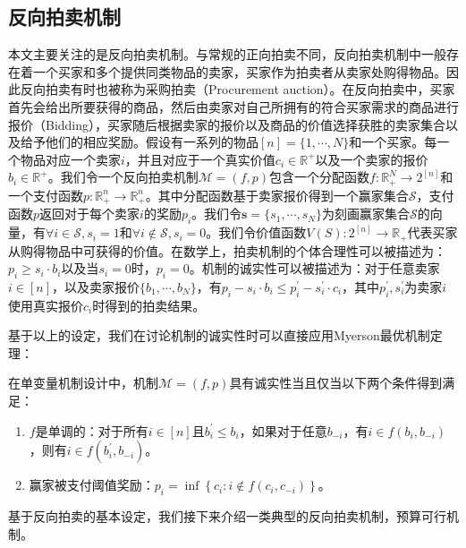 


\subsection{反向拍卖机制}

本文主要关注的是反向拍卖机制。与常规的正向拍卖不同，反向拍卖机制中一般存在着一个买家和多个提供同类物品的卖家，买家作为拍卖者从卖家处购得物品。因此反向拍卖有时也被称为采购拍卖（Procurement auction）。在反向拍卖中，买家首先会给出所要获得的商品，然后由卖家对自己所拥有的符合买家需求的商品进行报价（Bidding），买家随后根据卖家的报价以及商品的价值选择获胜的卖家集合以及给予他们的相应奖励。假设有一系列的物品$[n]=\{1,\cdots,N\}$和一个买家。每一个物品对应一个卖家$i$，并且对应于一个真实价值$c_i\in\mathbb{R}^+$以及一个卖家的报价$b_i\in\mathbb{R}^+$。我们令一个反向拍卖机制$\mathcal{M}=(f, p)$包含一个分配函数$f: \mathbb{R}_{+}^{N} \rightarrow 2^{[n]}$和一个支付函数$p: \mathbb{R}_{+}^{n} \rightarrow \mathbb{R}_{+}^{n}$。其中分配函数基于卖家报价得到一个赢家集合$\mathcal{S}$，支付函数$p$返回对于每个卖家$i$的奖励$p_i$。我们令$\mathbf{s}=\{s_1,\cdots,s_N\}$为刻画赢家集合$\mathcal{S}$的向量，有$\forall i\in\mathcal{S}, s_i=1$和$\forall i\notin\mathcal{S}, s_i=0$。我们令价值函数$V(S): 2^{[n]} \rightarrow \mathbb{R}_{+}$代表买家从购得物品中可获得的价值。在数学上，拍卖机制的个体合理性可以被描述为：$p_i\geq s_i\cdot b_i$以及当$s_i=0$时，$p_i=0$。机制的诚实性可以被描述为：对于任意卖家$i\in[n]$，以及卖家报价$\{b_1,\cdots,b_N\}$，有$p_{i}-s_{i} \cdot b_{i} \leq p_{i}^{\prime}-s_{i}^{\prime} \cdot c_{i}$，其中$p_{i}^{\prime},s_{i}^{\prime}$为卖家$i$使用真实报价$c_i$时得到的拍卖结果。

基于以上的设定，我们在讨论机制的诚实性时可以直接应用Myerson最优机制定理\cite{Myerson1981}：
\begin{thm}
在单变量机制设计中，机制$\mathcal{M}=(f, p)$具有诚实性当且仅当以下两个条件得到满足：
\begin{enumerate}
\item $f$是单调的：对于所有$i \in[n]$且$b_{i}^{\prime} \leq b_{i}$，如果对于任意$b_{-i}$，有$i\in f\left(b_{i}, b_{-i}\right)$，则有$i \in f\left(b_{i}^{\prime}, b_{-i}\right)$。
\item 赢家被支付阈值奖励：$p_i = \inf \left\{c_{i}: i \notin f\left(c_{i}, c_{-i}\right)\right\}$。
\end{enumerate}
\end{thm}
基于反向拍卖的基本设定，我们接下来介绍一类典型的反向拍卖机制，预算可行机制。


